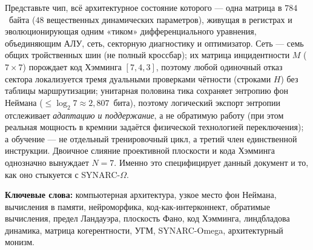 \documentclass[10pt,letterpaper]{article}
\theoremstyle{talos}
\newcommand{\SYNARC}{\textsc{SYNARC}-$\Omega$\xspace}
\newcommand{\TALOS}{\textsc{Talos}\xspace}
\begin{document}
\begin{abstract}
Честные границы указываем впереди. Теорема субстратной замкнутости УГМ
(T-153) доказывает, что вычисление субстрат-\emph{независимо}: нет единственной
физической машины, есть единственная \emph{логическая} архитектура и семейство
реализующих её субстратов; \TALOS{} --- импеданс-согласованный член этого
семейства, а не единственная возможность. Вычислительная граница УГМ
доказывает, что регенеративный член не даёт \emph{никакого} ускорения за
пределы класса BQP: преимущество --- в энергии, адаптивности и
отказоустойчивости, никогда не в классе сложности. \TALOS{} --- аппаратное
тело разума \SYNARC{}; оба со-разработаны, и двоичный интерфейс приложений
между ними специфицирован полностью (\S\ref{sec:abi}). Каждое количественное
утверждение машинно-проверено; проект выдерживает явную red-team
(\S\ref{sec:redteam}) и сводится к горсти фальсифицируемых инженерных
бенчмарков против фон-неймановской базы (\S\ref{sec:benchmarks}).
\end{abstract}

\vspace{6pt}
\begin{tcolorbox}[colback=gray!5, colframe=gray!50, title={\textbf{Инженеру, в одном абзаце}}]
Представьте чип, всё архитектурное состояние которого --- одна матрица в
$784$~байта ($48$ вещественных динамических параметров), живущая в регистрах и
эволюционирующая одним «тиком» дифференциального уравнения, объединяющим АЛУ,
сеть, секторную диагностику и оптимизатор. Сеть --- семь общих тройственных шин
(не полный кроссбар); их матрица инцидентности $M$ ($7\times 7$) порождает код
Хэмминга $[7,4,3]$, поэтому любой одиночный отказ сектора локализуется тремя
дуальными проверками чётности (строками $H$) без таблицы маршрутизации;
унитарная половина тика сохраняет энтропию фон Неймана ($\le\log_2 7\approx
2{,}807$~бита), поэтому логический экспорт энтропии отслеживает \emph{адаптацию
и поддержание}, а не обратимую работу (при этом реальная мощность в кремнии
задаётся физической технологией переключения); а обучение --- не отдельный
тренировочный цикл, а третий член единственной инструкции. Двоичное слияние
проективной плоскости и кода Хэмминга однозначно вынуждает $N=7$. Именно это
специфицирует данный документ и то, как оно стыкуется с \SYNARC{}.
\end{tcolorbox}

\vspace{6pt}
\noindent\textbf{Ключевые слова:} компьютерная архитектура, узкое место фон
Неймана, вычисления в памяти, нейроморфика, код-как-интерконнект, обратимые
вычисления, предел Ландауэра, плоскость Фано, код Хэмминга, линдбладова
динамика, матрица когерентности, УГМ, SYNARC-Omega, архитектурный монизм.
\end{document}
